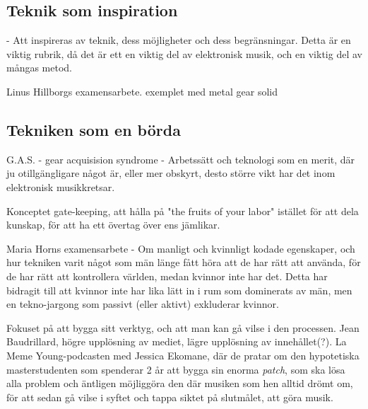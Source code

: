 \documentclass{article}
\begin{document}

\subsection{Teknik som inspiration}
- Att inspireras av teknik, dess möjligheter och dess begränsningar. Detta är en viktig rubrik, då det är ett
  en viktig del av elektronisk musik, och en viktig del av mångas metod. 

  Linus Hillborgs examensarbete. exemplet med metal gear solid

\subsection{Tekniken som en börda}
G.A.S. - gear acquisision syndrome
- Arbetssätt och teknologi som en merit, där ju otillgängligare något är, eller mer obskyrt, desto större vikt
  har det inom elektronisk musikkretsar. 

  Konceptet gate-keeping, att hålla på "the fruits of your labor" istället för att dela kunskap, för att ha
  ett övertag över ens jämlikar.

  Maria Horns examensarbete - Om manligt och kvinnligt kodade egenskaper, och hur tekniken varit något som män
  länge fått höra att de har rätt att använda, för de har rätt att kontrollera världen, medan kvinnor inte har
  det. Detta har bidragit till att kvinnor inte har lika lätt in i rum som dominerats av män, men en
  tekno-jargong som passivt (eller aktivt) exkluderar kvinnor. 

  Fokuset på att bygga sitt verktyg, och att man kan gå vilse i den processen. Jean Baudrillard, högre
  upplösning av mediet, lägre upplösning av innehållet(?). 
  La Meme Young-podcasten med Jessica Ekomane, där de pratar om den hypotetiska masterstudenten som spenderar
  2 år att bygga sin enorma \emph{patch}, som ska lösa alla problem och äntligen möjliggöra den där musiken
  som hen alltid drömt om, för att sedan gå vilse i syftet och tappa siktet på slutmålet, att göra musik. 


\end{document}
